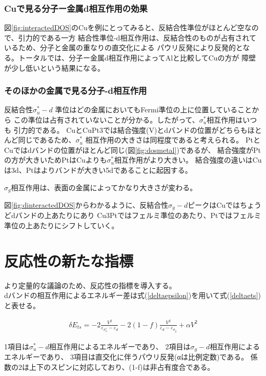 \documentclass[12pt]{ltjsarticle}
\begin{document}
\subsubsection{Cuで見る分子ー金属d相互作用の効果}
図\ref{fig:interactedDOS}のCuを例にとってみると、反結合性準位がほとんど空なので、引力的である一方
結合性準位-d相互作用は、反結合性のものが占有されているため、分子と金属の重なりの直交化による
パウリ反発により反発的となる。トータルでは、分子ー金属d相互作用によってAlと比較してCuの方が
障壁が少し低いという結果になる。

\subsubsection{そのほかの金属で見る分子-d相互作用}
反結合性$ \sigma _u ^* -d$ 準位はどの金属においてもFermi準位の上に位置していることから
この準位は占有されていないことが分かる。したがって、$ \sigma _u ^*$相互作用はいつも
引力的である。
CuとCuPt3では結合強度(V)とdバンドの位置がどちらもほとんど同じであるため、$ \sigma _u ^*$
相互作用の大きさは同程度であると考えられる。
PtとCuではdバンドの位置がほとんど同じ(図\ref{fig:dosmetal})であるが、
結合強度がPtの方が大きいためPtはCuよりも$ \sigma _u ^*$相互作用がより大きい。
結合強度の違いはCuは3d、Ptはよりバンドが大きい5dであることに起因する。

$\sigma _g$相互作用は、表面の金属によってかなり大きさが変わる。

図\ref{fig:dinteractedDOS}からわかるように、反結合性$\sigma _g -d$ピークはCuではちょうどdバンドの上あたりにあり
Cu3Ptではフェルミ準位のあたり、Ptではフェルミ準位の上あたりにシフトしていく。

\section{反応性の新たな指標}
より定量的な議論のため、反応性の指標を導入する。\\
dバンドの相互作用によるエネルギー差は式(\ref{deltaepsilon})を用いて式(\ref{deltaets})と表せる。

\begin{eqnarray}
    \label{deltaets}
    \delta E_{ts} = -2 \frac{ V^2 }{\varepsilon _{\sigma_u^*} - \varepsilon _d}
                    -2(1-f)\frac{V^2}{\varepsilon _d - \varepsilon _{\sigma_g}}
                    + \alpha V^2
\end{eqnarray}

1項目は$\sigma _u ^* -d$相互作用によるエネルギーであり、
2項目は$\sigma _g -d$相互作用によるエネルギーであり、
3項目は直交化に伴うパウリ反発(αは比例定数)である。
係数の2は上下のスピンに対応しており、(1-f)は非占有度合である。
\end{document}
